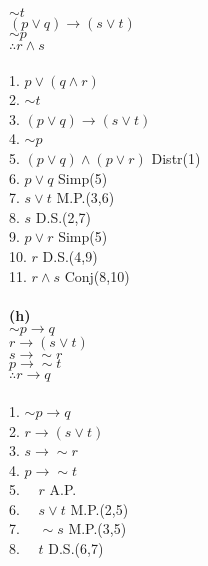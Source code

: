 \documentclass{article}
\begin{document}
$\sim t$ \\
$(p \vee q) \rightarrow (s \vee t)$ \\
\underline{$\sim p$} \\
$\therefore r \wedge s$ \\ \\ 
1. $p \vee (q \wedge r)$ \\
2. $\sim t$ \\
3. $(p \vee q) \rightarrow (s \vee t)$ \\
4. $\sim p$ \\
5. $(p\vee q) \wedge (p \vee r)$ \hspace*{\fill} Distr(1) \\
6. $p \vee q$\hspace*{\fill} Simp(5) \\
7. $s \vee t$\hspace*{\fill} M.P.(3,6) \\
8. $s$\hspace*{\fill} D.S.(2,7) \\
9. $p \vee r $\hspace*{\fill} Simp(5) \\
10. $r$\hspace*{\fill} D.S.(4,9) \\
11. $r \wedge s$ \hspace*{\fill} Conj(8,10) \\ \\ 
\textbf{(h)} \\ 
$\sim p \rightarrow q$ \\
$r \rightarrow (s \vee t)$ \\ 
$s \rightarrow \sim r$ \\
\underline{$p \rightarrow \sim t$} \\ 
$\therefore r \rightarrow q$ \\ \\ 
1. $\sim p \rightarrow q$ \\
2. $r \rightarrow (s \vee t)$ \\ 
3. $s \rightarrow \sim r$ \\
4. $p \rightarrow \sim t$ \\ 
5. $\quad r $\hspace*{\fill} A.P. \\
6. $\quad s \vee t$\hspace*{\fill} M.P.(2,5) \\
7. $\quad \sim s $\hspace*{\fill} M.P.(3,5) \\
8. $\quad t $\hspace*{\fill} D.S.(6,7) \\
\end{document}
